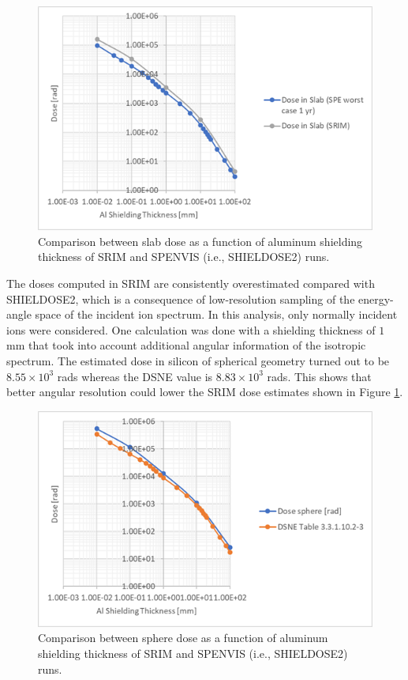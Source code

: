\documentclass{hitec}
\begin{document}
\begin{figure}[h!]
	\centering
	\includegraphics[scale=0.9]{Dose_vs_shielding_slab_comparison.png}
	\caption{Comparison between slab dose as a function of aluminum shielding thickness of SRIM and SPENVIS (i.e., SHIELDOSE2) runs.}\label{fig:Dose_vs_shielding_slab_comparison}
\end{figure}

The doses computed in SRIM are consistently overestimated compared with SHIELDOSE2, which is a consequence of low-resolution sampling of the energy-angle space of the incident ion spectrum. In this analysis, only normally incident ions were considered. One calculation was done with a shielding thickness of $1$ mm that took into account additional angular information of the isotropic spectrum. The estimated dose in silicon of spherical geometry turned out to be $8.55\times 10^{3}$ rads whereas the DSNE value is $8.83\times 10^{3}$ rads. This shows that better angular resolution could lower the SRIM dose estimates shown in Figure \ref{fig:Dose_vs_shielding_slab_comparison}.

\begin{figure}[h!]
	\centering
	\includegraphics[scale=0.9]{Dose_vs_shielding_sphere_comparison.png}
	\caption{Comparison between sphere dose as a function of aluminum shielding thickness of SRIM and SPENVIS (i.e., SHIELDOSE2) runs.}\label{fig:Dose_vs_shielding_sphere_comparison}
\end{figure}
\end{document}

